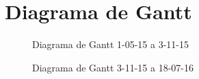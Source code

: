 \section{Diagrama de Gantt}
\begin{figure}[H]
\caption{Diagrama de Gantt 1-05-15 a 3-11-15}
\end{figure}
\newpage
\begin{figure}[H]
\caption{Diagrama de Gantt 3-11-15 a 18-07-16}
\end{figure}
\newpage
